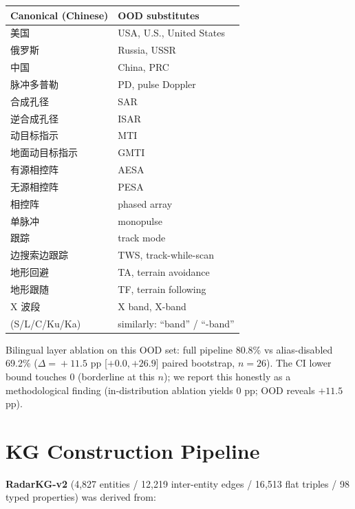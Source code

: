 \documentclass[review]{elsarticle}
\begin{document}
\begin{table}[h]
\centering
\small
\begin{tabular}{l l}
\toprule
\textbf{Canonical (Chinese)} & \textbf{OOD substitutes} \\
\midrule
美国             & USA, U.S., United States \\
俄罗斯           & Russia, USSR \\
中国             & China, PRC \\
脉冲多普勒       & PD, pulse Doppler \\
合成孔径         & SAR \\
逆合成孔径       & ISAR \\
动目标指示       & MTI \\
地面动目标指示   & GMTI \\
有源相控阵       & AESA \\
无源相控阵       & PESA \\
相控阵           & phased array \\
单脉冲           & monopulse \\
跟踪             & track mode \\
边搜索边跟踪     & TWS, track-while-scan \\
地形回避         & TA, terrain avoidance \\
地形跟随         & TF, terrain following \\
X 波段           & X band, X-band \\
(S/L/C/Ku/Ka)    & similarly: ``band'' / ``-band'' \\
\bottomrule
\end{tabular}
\end{table}

Bilingual layer ablation on this OOD set: full pipeline 80.8\% vs alias-disabled 69.2\% ($\Delta\!=\!+11.5$ pp [$+0.0, +26.9$] paired bootstrap, $n\!=\!26$). The CI lower bound touches 0 (borderline at this $n$); we report this honestly as a methodological finding (in-distribution ablation yields 0 pp; OOD reveals $+11.5$ pp).

\section{KG Construction Pipeline}
\label{app:kg}

\textbf{RadarKG-v2} (4{,}827 entities / 12{,}219 inter-entity edges / 16{,}513 flat triples / 98 typed properties) was derived from:
\end{document}
